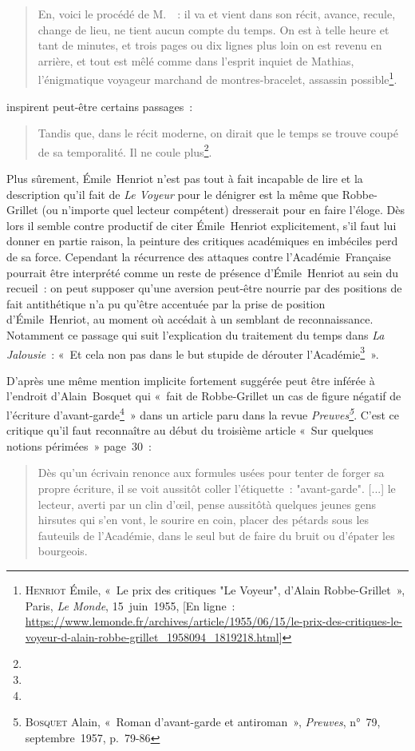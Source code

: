 \documentclass[12pt, a4paper]{article}
\begin{document}
\begin{quote}
    En, voici le procédé de M.~\robbe~: il va et vient dans son récit, avance, recule, change de lieu, ne tient aucun compte du temps. On est à telle heure et tant de minutes, et trois pages ou dix lignes plus loin on est revenu en arrière, et tout est mêlé comme dans l'esprit inquiet de Mathias, l'énigmatique voyageur marchand de montres-bracelet, assassin possible\footnote{\op\textsc{Henriot} Émile, «~Le prix des critiques "Le Voyeur", d'Alain Robbe-Grillet~», Paris, \textit{Le Monde}, 15~juin~1955, [En ligne~: \href{https://www.lemonde.fr/archives/article/1955/06/15/le-prix-des-critiques-le-voyeur-d-alain-robbe-grillet_1958094_1819218.html}{https://www.lemonde.fr/archives/article/1955/06/15/le-prix-des-critiques-le-voyeur-d-alain-robbe-grillet\_1958094\_1819218.html}]}.
\end{quote}
inspirent peut-être certains passages~:
\begin{quote}
    Tandis que, dans le récit moderne, on dirait que le temps se trouve coupé de sa temporalité. Il ne coule plus\footnote{}.
\end{quote}
Plus sûrement, Émile~Henriot n'est pas tout à fait incapable de lire et la description qu'il fait de \textit{Le Voyeur} pour le dénigrer est la même que Robbe-Grillet (ou n'importe quel lecteur compétent) dresserait pour en faire l'éloge. Dès lors il semble contre productif de citer Émile~Henriot explicitement, s'il faut lui donner en partie raison, la peinture des critiques académiques en imbéciles perd de sa force. Cependant la récurrence des attaques contre l'Académie~Française pourrait être interprété comme un reste de présence d'Émile~Henriot au sein du recueil~: on peut supposer qu'une aversion peut-être nourrie par des positions de fait antithétique n'a pu qu'être accentuée par la prise de position d'Émile~Henriot, au moment où \robbe{} accédait à un semblant de reconnaissance. Notamment ce passage qui suit l'explication du traitement du temps dans \textit{La Jalousie}~: «~Et cela non pas dans le but stupide de dérouter l'Académie\footnote{}~».

D'après \galia{} une même mention implicite fortement suggérée peut être inférée à l'endroit d'Alain~Bosquet qui «~fait de Robbe-Grillet un cas de figure négatif de l’écriture d’avant-garde\footnote{}~» dans un article paru dans la revue \textit{Preuves\footnote{\textsc{Bosquet} Alain, «~Roman d’avant-garde et antiroman~», \textit{Preuves}, n°~79, septembre~1957, p.~79-86}}. C'est ce critique qu'il faut reconnaître au début du troisième article «~Sur quelques notions périmées~» page~30~:
\begin{quote}
    Dès qu'un écrivain renonce aux formules usées pour tenter de forger sa propre écriture, il se voit aussitôt coller l'étiquette~: "avant-garde". [...] le lecteur, averti par un clin d'œil, pense aussitôtà quelques jeunes gens hirsutes qui s'en vont, le sourire en coin, placer des pétards sous les fauteuils de l'Académie, dans le seul but de faire du bruit ou d'épater les bourgeois.
\end{quote}
\end{document}
